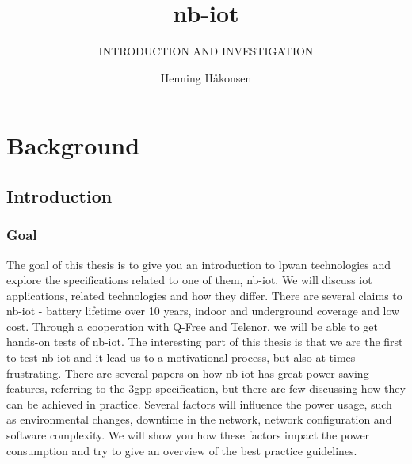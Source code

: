 \documentclass[USenglish]{ifimaster}  %
\title{\acrlong{nb-iot}}
\subtitle{INTRODUCTION AND INVESTIGATION}
\author{Henning Håkonsen}
\begin{document}
\frontmatter

\duoforside[dept={Department of Informatics},   %
  program={Network and system administration},  %
  long]                                        %

\tableofcontents

\newpage
\lstlistoflistings

\newpage
\listoffigures

\newpage
\listoftables

\cleardoublepage


\cleardoublepage


\mainmatter{}

\part{Background}
\chapter{Introduction}

\section{Goal}
The goal of this thesis is to give you an introduction to \acrfull{lpwan} technologies and explore the specifications related to one of them, \acrfull{nb-iot}. We will discuss \acrshort{iot} applications, related technologies and how they differ. There are several claims to \acrshort{nb-iot} - battery lifetime over 10 years, indoor and underground coverage and low cost. Through a cooperation with Q-Free and Telenor, we will be able to get hands-on tests of \acrshort{nb-iot}. The interesting part of this thesis is that we are the first to test \acrshort{nb-iot} and it lead us to a motivational process, but also at times frustrating. There are several papers on how \acrshort{nb-iot} has great power saving features, referring to the \acrfull{3gpp} specification, but there are few discussing how they can be achieved in practice. Several factors will influence the power usage, such as environmental changes, downtime in the network, network configuration and software complexity. We will show you how these factors impact the power consumption and try to give an overview of the best practice guidelines.
\end{document}
